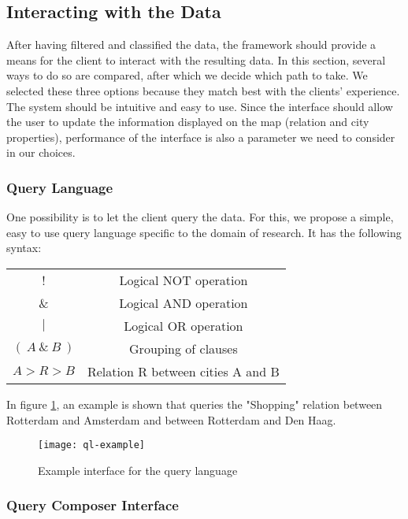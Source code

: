 \subsection{Interacting with the Data}
After having filtered and classified the data, the framework should provide a means for the client to interact with the resulting data. In this section, several ways to do so are compared, after which we decide which path to take. We selected these three options because they match best with the clients' experience. The system should be intuitive and easy to use. Since the interface should allow the user to update the information displayed on the map (relation and city properties), performance of the interface is also a parameter we need to consider in our choices.  

\subsubsection{Query Language}

One possibility is to let the client query the data. For this, we propose a simple, easy to use query language specific to the domain of research. It has the following syntax:

\begin{center}
\begin{tabular}{ |c|c| } 
 \hline
 ! & Logical NOT operation \\
 \& & Logical AND operation \\ 
 $|$ & Logical OR operation \\ 
 $(~A~\&~B~)$ & Grouping of clauses \\
 $A > R > B$ & Relation R between cities A and B \\
 \hline
\end{tabular}
\end{center}

In figure \ref{fig:ql-example}, an example is shown that queries the "Shopping" relation between Rotterdam and Amsterdam and between Rotterdam and Den Haag.

\begin{figure}[ht]
\centering
\texttt{[image: ql-example]}
\caption{Example interface for the query language}
\label{fig:ql-example}
\end{figure}

\subsubsection{Query Composer Interface}


